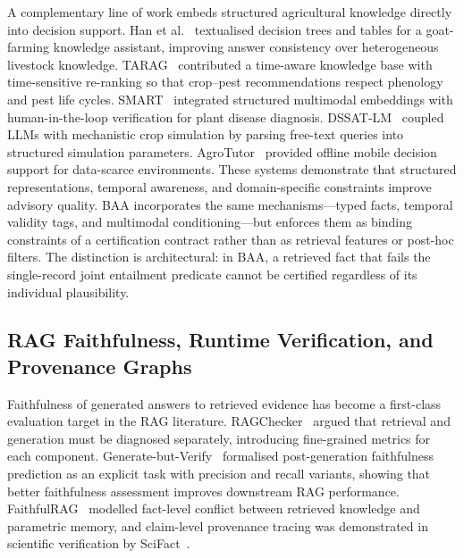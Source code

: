 A complementary line of work embeds structured agricultural knowledge directly into decision support. Han et al.~\citep{goatrag2026} textualised decision trees and tables for a goat-farming knowledge assistant, improving answer consistency over heterogeneous livestock knowledge. TARAG~\citep{tarag2026} contributed a time-aware knowledge base with time-sensitive re-ranking so that crop--pest recommendations respect phenology and pest life cycles. SMART~\citep{smart2026} integrated structured multimodal embeddings with human-in-the-loop verification for plant disease diagnosis. DSSAT-LM~\citep{dssatlm2026} coupled LLMs with mechanistic crop simulation by parsing free-text queries into structured simulation parameters. AgroTutor~\citep{agrotutor2020} provided offline mobile decision support for data-scarce environments. These systems demonstrate that structured representations, temporal awareness, and domain-specific constraints improve advisory quality. BAA incorporates the same mechanisms---typed facts, temporal validity tags, and multimodal conditioning---but enforces them as binding constraints of a certification contract rather than as retrieval features or post-hoc filters. The distinction is architectural: in BAA, a retrieved fact that fails the single-record joint entailment predicate cannot be certified regardless of its individual plausibility.

\subsection{RAG Faithfulness, Runtime Verification, and Provenance Graphs}
Faithfulness of generated answers to retrieved evidence has become a first-class evaluation target in the RAG literature. RAGChecker~\citep{ragchecker2024} argued that retrieval and generation must be diagnosed separately, introducing fine-grained metrics for each component. Generate-but-Verify~\citep{generateverify2025} formalised post-generation faithfulness prediction as an explicit task with precision and recall variants, showing that better faithfulness assessment improves downstream RAG performance. FaithfulRAG~\citep{faithfulrag2025} modelled fact-level conflict between retrieved knowledge and parametric memory, and claim-level provenance tracing was demonstrated in scientific verification by SciFact~\citep{scifact2020}.

